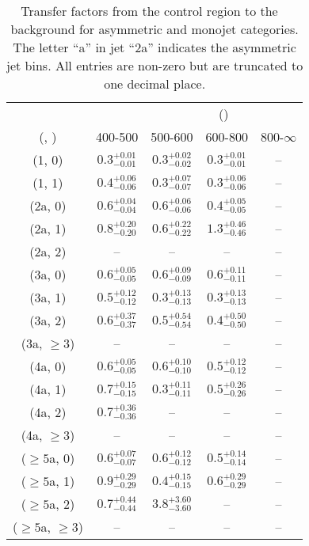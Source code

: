 \begin{table}[h!]
\tiny
\centering
\caption{Transfer factors from the \gj control region to the \zInv~ background for asymmetric and monojet categories. The letter ``a'' in jet \eg ``2a''  indicates the asymmetric jet bins. All entries are non-zero but are truncated to one decimal place.\label{tab:tf_zinv_gj_asym}}
\begin{tabular}
{ccccc}
	\hline\hline
&	& \multicolumn{4}{c}{\scalht (\gev)} \\ 
	 (\njet,  \nb) & 400-500 & 500-600 & 600-800 & 800-$\infty$ \\ [0.8ex] 
\hline
	(1, 0) & $0.3^{+ 0.01 }_{- 0.01 }$ & $0.3^{+ 0.02 }_{- 0.02 }$ & $0.3^{+ 0.01 }_{- 0.01 }$ & -- \\[0.5ex] 
	(1, 1) & $0.4^{+ 0.06 }_{- 0.06 }$ & $0.3^{+ 0.07 }_{- 0.07 }$ & $0.3^{+ 0.06 }_{- 0.06 }$ & -- \\[0.5ex] 
	(2a, 0) & $0.6^{+ 0.04 }_{- 0.04 }$ & $0.6^{+ 0.06 }_{- 0.06 }$ & $0.4^{+ 0.05 }_{- 0.05 }$ & -- \\[0.5ex] 
	(2a, 1) & $0.8^{+ 0.20 }_{- 0.20 }$ & $0.6^{+ 0.22 }_{- 0.22 }$ & $1.3^{+ 0.46 }_{- 0.46 }$ & -- \\[0.5ex] 
	(2a, 2) & -- & -- & -- & -- \\[0.5ex] 
	(3a, 0) & $0.6^{+ 0.05 }_{- 0.05 }$ & $0.6^{+ 0.09 }_{- 0.09 }$ & $0.6^{+ 0.11 }_{- 0.11 }$ & -- \\[0.5ex] 
	(3a, 1) & $0.5^{+ 0.12 }_{- 0.12 }$ & $0.3^{+ 0.13 }_{- 0.13 }$ & $0.3^{+ 0.13 }_{- 0.13 }$ & -- \\[0.5ex] 
	(3a, 2) & $0.6^{+ 0.37 }_{- 0.37 }$ & $0.5^{+ 0.54 }_{- 0.54 }$ & $0.4^{+ 0.50 }_{- 0.50 }$ & -- \\[0.5ex] 
	(3a, $\ge3$) & -- & -- & -- & -- \\[0.5ex] 
	(4a, 0) & $0.6^{+ 0.05 }_{- 0.05 }$ & $0.6^{+ 0.10 }_{- 0.10 }$ & $0.5^{+ 0.12 }_{- 0.12 }$ & -- \\[0.5ex] 
	(4a, 1) & $0.7^{+ 0.15 }_{- 0.15 }$ & $0.3^{+ 0.11 }_{- 0.11 }$ & $0.5^{+ 0.26 }_{- 0.26 }$ & -- \\[0.5ex] 
	(4a, 2) & $0.7^{+ 0.36 }_{- 0.36 }$ & -- & -- & -- \\[0.5ex] 
	(4a, $\ge3$) & -- & -- & -- & -- \\[0.5ex] 
	($\ge5$a, 0) & $0.6^{+ 0.07 }_{- 0.07 }$ & $0.6^{+ 0.12 }_{- 0.12 }$ & $0.5^{+ 0.14 }_{- 0.14 }$ & -- \\[0.5ex] 
	($\ge5$a, 1) & $0.9^{+ 0.29 }_{- 0.29 }$ & $0.4^{+ 0.15 }_{- 0.15 }$ & $0.6^{+ 0.29 }_{- 0.29 }$ & -- \\[0.5ex] 
	($\ge5$a, 2) & $0.7^{+ 0.44 }_{- 0.44 }$ & $3.8^{+ 3.60 }_{- 3.60 }$ & -- & -- \\[0.5ex] 
	($\ge5$a, $\ge3$) & -- & -- & -- & -- \\[0.5ex] 
	\hline
	\hline
\end{tabular}
\end{table}
